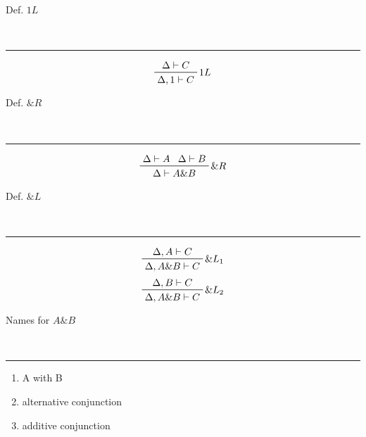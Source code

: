 \begin{note}
  \begin{field}
    Def. $1 L$
  \end{field} \\
  \noindent\rule[0.5ex]{\linewidth}{1pt}
  \begin{field}
    \[
      \prftree[r]
      {$1 L$}
      {\Delta\vdash C}
      {\Delta,1\vdash C}
    \]
  \end{field}
\end{note}

\begin{note}
  \begin{field}
    Def. $\&R$
  \end{field} \\
  \noindent\rule[0.5ex]{\linewidth}{1pt}
  \begin{field}
    \[
      \prftree[r]
      {$\&R$}
      {\Delta\vdash A}
      {\Delta\vdash B}
      {\Delta\vdash A\& B}
    \]
  \end{field}
\end{note}

\begin{note}
  \begin{field}
    Def. $\& L$
  \end{field} \\
  \noindent\rule[0.5ex]{\linewidth}{1pt}
  \begin{field}
    \[
      \prftree[r]
      {$\&L_1$}
      {\Delta, A\vdash C}
      {\Delta, A\&B\vdash C}
    \]
    \[
      \prftree[r]
      {$\&L_2$}
      {\Delta, B\vdash C}
      {\Delta, A\&B\vdash C}
    \]
  \end{field}
\end{note}

\begin{note}
  \begin{field}
    Names for $A\& B$
  \end{field} \\
  \noindent\rule[0.5ex]{\linewidth}{1pt}
  \begin{field}
    \begin{enumerate}
      \item A with B
      \item alternative conjunction
      \item additive conjunction
    \end{enumerate}
  \end{field}
\end{note}

